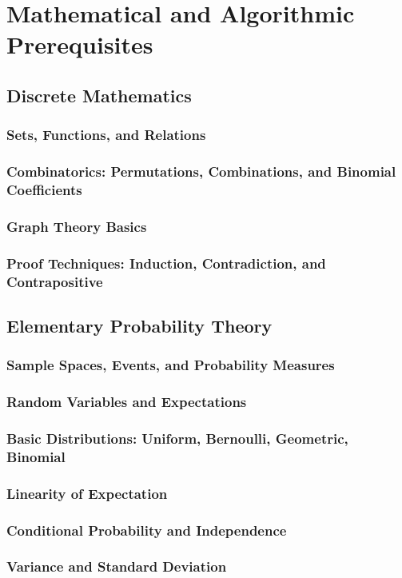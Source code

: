 
\chapter{Mathematical and Algorithmic Prerequisites}
\section{Discrete Mathematics}
\subsection{Sets, Functions, and Relations}
\subsection{Combinatorics: Permutations, Combinations, and Binomial Coefficients}
\subsection{Graph Theory Basics}
\subsection{Proof Techniques: Induction, Contradiction, and Contrapositive}

\section{Elementary Probability Theory}
\subsection{Sample Spaces, Events, and Probability Measures}
\subsection{Random Variables and Expectations}
\subsection{Basic Distributions: Uniform, Bernoulli, Geometric, Binomial}
\subsection{Linearity of Expectation}
\subsection{Conditional Probability and Independence}
\subsection{Variance and Standard Deviation}

